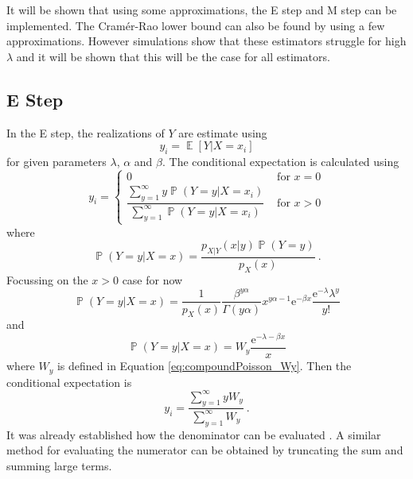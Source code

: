 \documentclass[12pt, a4paper]{memoir}
\DeclareMathOperator{\expectation}{\mathbb{E}}
\DeclareMathOperator{\prob}{\mathbb{P}}
\newcommand{\euler}{\mathrm{e}}
\begin{document}
It will be shown that using some approximations, the E step and M step can be implemented. The Cram\'er-Rao lower bound \citep{rao1945information} \citep{cramer1946mathematical} can also be found by using a few approximations. However simulations show that these estimators struggle for high $\lambda$ and it will be shown that this will be the case for all estimators.

\subsection{E Step}

In the E step, the realizations of $Y$ are estimate using
\begin{equation}
y_i = \expectation\left[
Y|X=x_i
\right]
\end{equation}
for given parameters $\lambda$, $\alpha$ and $\beta$. The conditional expectation is calculated using
\begin{equation}
y_i = 
\begin{cases}
0 & \text{ for } x=0 \\ 
\dfrac{\sum_{y=1}^\infty y \prob(Y=y|X=x_i)}{\sum_{y=1}^\infty \prob(Y=y|X=x_i)} & \text{ for } x>0
\end{cases}
\end{equation}
where
\begin{equation*}
\prob(Y=y|X=x) = \frac{p_{X|Y}(x|y)\prob(Y=y)}{p_X(x)} \ .
\end{equation*}
Focussing on the $x>0$ case for now
\begin{equation*}
\prob(Y=y|X=x) = \frac{1}{p_X(x)}\frac{\beta^{y\alpha}}{\Gamma(y\alpha)}x^{y\alpha-1}\euler^{-\beta x}\frac{\euler^{-\lambda}\lambda^y}{y!}
\end{equation*}
and
\begin{equation}
\prob(Y=y|X=x) = W_y \frac{\euler^{-\lambda-\beta x}}{x}
\end{equation}
where $W_y$ is defined in Equation \eqref{eq:compoundPoisson_Wy}.
Then the conditional expectation is
\begin{equation}
y_i = \frac{\sum_{y=1}^\infty y W_y}{\sum_{y=1}^\infty W_y} \ .
\end{equation}
It was already established how the denominator can be evaluated \citep{dunn2005series}. A similar method for evaluating the numerator can be obtained by truncating the sum and summing large terms.
\end{document}
